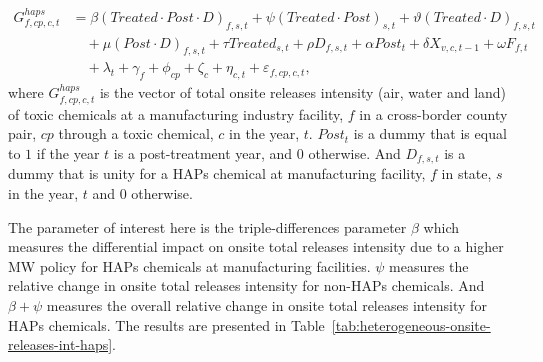 \documentclass[12pt, english]{article}
\begin{document}
    \begin{align}
        G_{f,cp,c,t}^{haps} &= \beta (Treated \cdot Post \cdot D)_{f,s,t} + \psi (Treated \cdot Post)_{s,t} + \vartheta (Treated \cdot D)_{f,s,t} \nonumber \\
        &\quad + \mu (Post \cdot D)_{f,s,t} + \tau Treated_{s,t} + \rho D_{f,s,t} + \alpha Post_{t} + \delta X_{v,c,t-1} + \omega F_{f,t} \nonumber \\
        &\quad + \lambda_{t} + \gamma_{f} + \phi_{cp} + \zeta_{c} + \eta_{c,t} + \varepsilon_{f,cp,c,t},\label{eq:heterogeneous-onsite-releases-intensity-haps}
    \end{align}
    where $G_{f,cp,c,t}^{haps}$ is the vector of total onsite releases intensity (air, water and land) of toxic chemicals at a manufacturing industry facility, $f$ in a cross-border county pair, $cp$ through a toxic chemical, $c$ in the year, $t$. $Post_{t}$ is a dummy that is equal to $1$ if the year $t$ is a post-treatment year, and $0$ otherwise. And $D_{f,s,t}$ is a dummy that is unity for a HAPs chemical at manufacturing facility, $f$ in state, $s$ in the year, $t$ and $0$ otherwise.
    

    The parameter of interest here is the triple-differences parameter $\beta$ which measures the differential impact on onsite total releases intensity due to a higher MW policy for HAPs chemicals at manufacturing facilities. $\psi$ measures the relative change in onsite total releases intensity for non-HAPs chemicals. And $\beta + \psi$ measures the overall relative change in onsite total releases intensity for HAPs chemicals. The results are presented in Table~\ref{tab:heterogeneous-onsite-releases-int-haps}.
    
\end{document}
